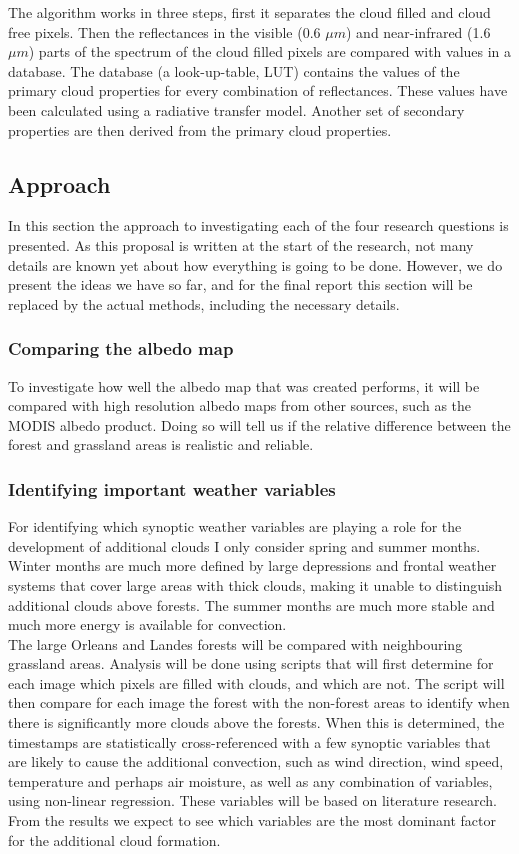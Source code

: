 \documentclass{article}
\begin{document}
The algorithm works in three steps, first it separates the cloud filled and cloud free pixels. Then the reflectances in the visible (0.6 $\mu m$) and near-infrared (1.6 $\mu m$) parts of the spectrum of the cloud filled pixels are compared with values in a database. The database (a look-up-table, LUT) contains the values of the primary cloud properties for every combination of reflectances. These values have been calculated using a radiative transfer model. Another set of secondary properties are then derived from the primary cloud properties.

\subsection{Approach}
In this section the approach to investigating each of the four research questions is presented. As this proposal is written at the start of the research, not many details are known yet about how everything is going to be done. However, we do present the ideas we have so far, and for the final report this section will be replaced by the actual methods, including the necessary details.

\subsubsection{Comparing the albedo map}
To investigate how well the albedo map that was created performs, it will be compared with high resolution albedo maps from other sources, such as the MODIS albedo product. Doing so will tell us if the relative difference between the forest and grassland areas is realistic and reliable.


\subsubsection{Identifying important weather variables}
For identifying which synoptic weather variables are playing a role for the development of additional clouds I only consider spring and summer months. Winter months are much more defined by large depressions and frontal weather systems that cover large areas with thick clouds, making it unable to distinguish additional clouds above forests. The summer months are much more stable and much more energy is available for convection.\\

The large Orleans and Landes forests will be compared with neighbouring grassland areas. Analysis will be done using scripts that will first determine for each image which pixels are filled with clouds, and which are not. The script will then compare for each image the forest with the non-forest areas to identify when there is significantly more clouds above the forests. When this is determined, the timestamps are statistically cross-referenced with a few synoptic variables that are likely to cause the additional convection, such as wind direction, wind speed, temperature and perhaps air moisture, as well as any combination of variables, using non-linear regression. These variables will be based on literature research. From the results we expect to see which variables are the most dominant factor for the additional cloud formation.
\end{document}
